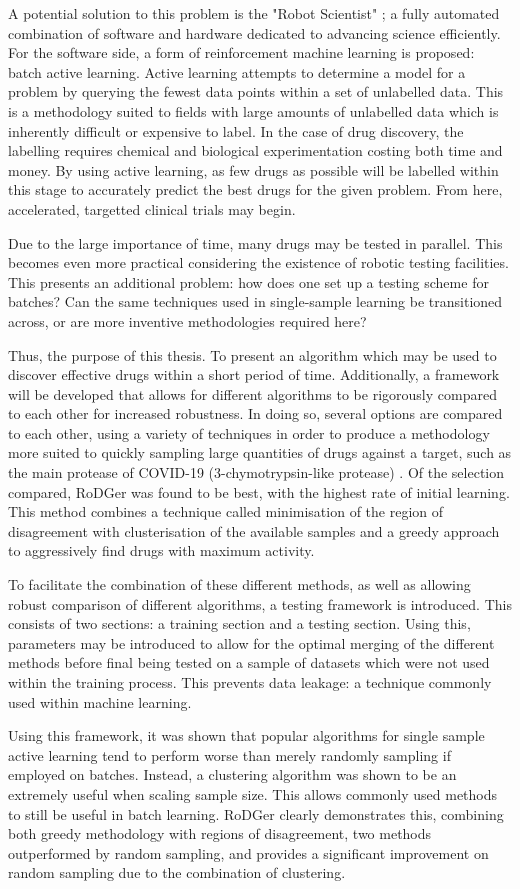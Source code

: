 A potential solution to this problem is the "Robot Scientist" \cite{And10}; a fully automated combination of software and hardware dedicated to advancing science efficiently. For the software side, a form of reinforcement machine learning is proposed: batch active learning. Active learning attempts to determine a model for a problem by querying the fewest data points within a set of unlabelled data. This is a methodology suited to fields with large amounts of unlabelled data which is inherently difficult or expensive to label. In the case of drug discovery, the labelling requires chemical and biological experimentation costing both time and money. By using active learning, as few drugs as possible will be labelled within this stage to accurately predict the best drugs for the given problem. From here, accelerated, targetted clinical trials may begin.

Due to the large importance of time, many drugs may be tested in parallel. This becomes even more practical considering the existence of robotic testing facilities. This presents an additional problem: how does one set up a testing scheme for batches? Can the same techniques used in single-sample learning be transitioned across, or are more inventive methodologies required here?

Thus, the purpose of this thesis. To present an algorithm which may be used to discover effective drugs within a short period of time. Additionally, a framework will be developed that allows for different algorithms to be rigorously compared to each other for increased robustness. In doing so, several options are compared to each other, using a variety of techniques in order to produce a methodology more suited to quickly sampling large quantities of drugs against a target, such as the main protease of \mbox{COVID-19} (3-chymotrypsin-like protease) \cite{prot20}. Of the selection compared, RoDGer was found to be best, with the highest rate of initial learning. This method combines a technique called minimisation of the region of disagreement with clusterisation of the available samples and a greedy approach to aggressively find drugs with maximum activity.

To facilitate the combination of these different methods, as well as allowing robust comparison of different algorithms, a testing framework is introduced. This consists of two sections: a training section and a testing section. Using this, parameters may be introduced to allow for the optimal merging of the different methods before final being tested on a sample of datasets which were not used within the training process. This prevents data leakage: a technique commonly used within machine learning.

Using this framework, it was shown that popular algorithms for single sample active learning tend to perform worse than merely randomly sampling if employed on batches. Instead, a clustering algorithm was shown to be an extremely useful when scaling sample size. This allows commonly used methods to still be useful in batch learning. RoDGer clearly demonstrates this, combining both greedy methodology with regions of disagreement, two methods outperformed by random sampling, and provides a significant improvement on random sampling due to the combination of clustering.